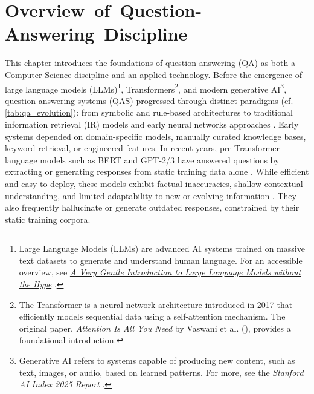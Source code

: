 \chapter{Overview~of~Question-Answering~Discipline}
\label{chap:QAS}
\sloppy
\begin{spacing}{1.5}

This chapter introduces the foundations of question answering (QA) as both a Computer Science discipline and an applied technology. Before the emergence of large language models (LLMs)\footnote{Large Language Models (LLMs) are advanced AI systems trained on massive text datasets to generate and understand human language. For an accessible overview, see \href{https://mark-riedl.medium.com/a-very-gentle-introduction-to-large-language-models-without-the-hype-5f67941fa59e}{\textit{A Very Gentle Introduction to Large Language Models without the Hype}} \citep{riedl_very_2023}.}, Transformers\footnote{The Transformer is a neural network architecture introduced in 2017 that efficiently models sequential data using a self-attention mechanism. The original paper, \textit{Attention Is All You Need} by Vaswani et al. (\citeyear{vaswani_attention_2017}), provides a foundational introduction.}, and modern generative AI\footnote{Generative AI refers to systems capable of producing new content, such as text, images, or audio, based on learned patterns. For more, see the \textit{Stanford AI Index 2025 Report} \citep{maslej_artificial_2025}.}, question-answering systems (QAS) progressed through distinct paradigms (cf. \autoref{tab:qa_evolution}): from symbolic and rule-based architectures to traditional information retrieval (IR) models and early neural networks approaches \citep{jurafsky_chapter_2024,antoniou_survey_2022}. Early systems depended on domain-specific models, manually curated knowledge bases, keyword retrieval, or engineered features. In recent years, pre-Transformer language models such as BERT and GPT-2/3 have answered questions by extracting or generating responses from static training data alone \citep{caballero_brief_2021}. While efficient and easy to deploy, these models exhibit factual inaccuracies, shallow contextual understanding, and limited adaptability to new or evolving information \citep{alanazi_question_2021}. They also frequently hallucinate or generate outdated responses, constrained by their static training corpora.


\end{spacing}
